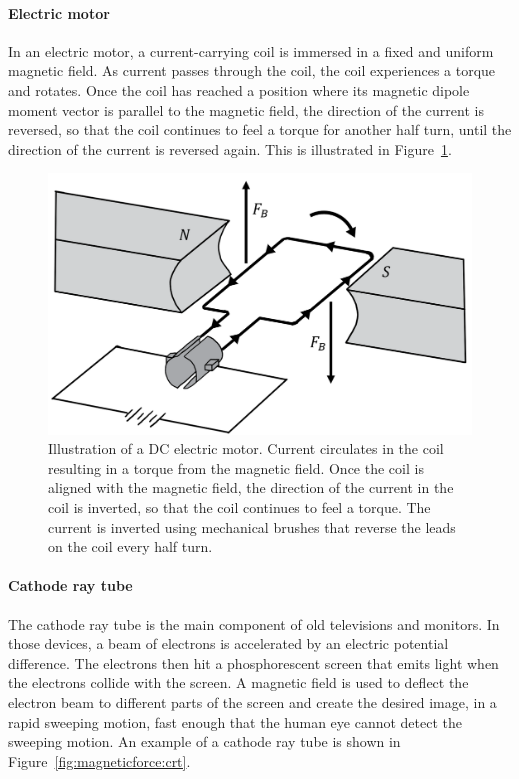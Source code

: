 \paragraph{Electric motor}

In an electric motor, a current-carrying coil is immersed in a fixed and uniform magnetic field. As current passes through the coil, the coil experiences a torque and rotates. Once the coil has reached a position where its magnetic dipole moment vector is parallel to the magnetic field, the direction of the current is reversed, so that the coil continues to feel a torque for another half turn, until the direction of the current is reversed again. This is illustrated in Figure~\ref{fig:magneticforce:dcmotor}.

\begin{figure}[!htbp]
\centering
\includegraphics[width=0.65\linewidth]{files/dcmotor-719f79ce1ca8e1c208426aca4192c7e9.png}
\caption[]{Illustration of a DC electric motor. Current circulates in the coil resulting in a torque from the magnetic field. Once the coil is aligned with the magnetic field, the direction of the current in the coil is inverted, so that the coil continues to feel a torque. The current is inverted using mechanical brushes that reverse the leads on the coil every half turn.}
\label{fig:magneticforce:dcmotor}
\end{figure}

\paragraph{Cathode ray tube}

The cathode ray tube is the main component of old televisions and monitors. In those devices, a beam of electrons is accelerated by an electric potential difference. The electrons then hit a phosphorescent screen that emits light when the electrons collide with the screen. A magnetic field is used to deflect the electron beam to different parts of the screen and create the desired image, in a rapid sweeping motion, fast enough that the human eye cannot detect the sweeping motion. An example of a cathode ray tube is shown in Figure~\ref{fig:magneticforce:crt}.

